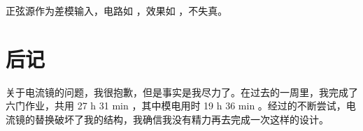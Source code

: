 \documentclass[lang=cn,11pt,a4paper,cite=authoryear]{elegantpaper}
\begin{document}


正弦源作为差模输入，电路如  ，效果如  ，不失真。



\section*{后记}

关于电流镜的问题，我很抱歉，但是事实是我尽力了。在过去的一周里，我完成了六门作业，共用 27 h 31 min ，其中模电用时 19 h 36 min 。经过的不断尝试，电流镜的替换破坏了我的结构，我确信我没有精力再去完成一次这样的设计。

\end{document}
